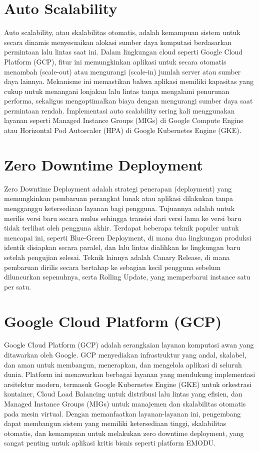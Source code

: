 \section{Auto Scalability}
Auto scalability, atau skalabilitas otomatis, adalah kemampuan sistem untuk secara dinamis menyesuaikan alokasi sumber daya komputasi berdasarkan permintaan lalu lintas saat ini.
Dalam lingkungan cloud seperti Google Cloud Platform (GCP), fitur ini memungkinkan aplikasi untuk secara otomatis menambah (scale-out) atau mengurangi (scale-in) jumlah server atau sumber daya lainnya.
Mekanisme ini memastikan bahwa aplikasi memiliki kapasitas yang cukup untuk menangani lonjakan lalu lintas tanpa mengalami penurunan performa, sekaligus mengoptimalkan biaya dengan mengurangi sumber daya saat permintaan rendah.
Implementasi auto scalability sering kali menggunakan layanan seperti Managed Instance Groups (MIGs) di Google Compute Engine atau Horizontal Pod Autoscaler (HPA) di Google Kubernetes Engine (GKE).

\section{Zero Downtime Deployment}
Zero Downtime Deployment adalah strategi penerapan (deployment) yang memungkinkan pembaruan perangkat lunak atau aplikasi dilakukan tanpa mengganggu ketersediaan layanan bagi pengguna.
Tujuannya adalah untuk merilis versi baru secara mulus sehingga transisi dari versi lama ke versi baru tidak terlihat oleh pengguna akhir.
Terdapat beberapa teknik populer untuk mencapai ini, seperti Blue-Green Deployment, di mana dua lingkungan produksi identik disiapkan secara paralel, dan lalu lintas dialihkan ke lingkungan baru setelah pengujian selesai.
Teknik lainnya adalah Canary Release, di mana pembaruan dirilis secara bertahap ke sebagian kecil pengguna sebelum diluncurkan sepenuhnya, serta Rolling Update, yang memperbarui instance satu per satu.

\section{Google Cloud Platform (GCP)}
Google Cloud Platform (GCP) adalah serangkaian layanan komputasi awan yang ditawarkan oleh Google.
GCP menyediakan infrastruktur yang andal, skalabel, dan aman untuk membangun, menerapkan, dan mengelola aplikasi di seluruh dunia.
Platform ini menawarkan berbagai layanan yang mendukung implementasi arsitektur modern, termasuk Google Kubernetes Engine (GKE) untuk orkestrasi kontainer, Cloud Load Balancing untuk distribusi lalu lintas yang efisien, dan Managed Instance Groups (MIGs) untuk manajemen dan skalabilitas otomatis pada mesin virtual.
Dengan memanfaatkan layanan-layanan ini, pengembang dapat membangun sistem yang memiliki ketersediaan tinggi, skalabilitas otomatis, dan kemampuan untuk melakukan zero downtime deployment, yang sangat penting untuk aplikasi kritis bisnis seperti platform EMODU.

